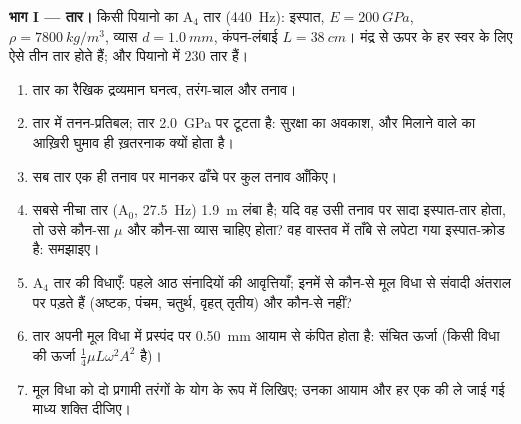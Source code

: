 \begin{problem}
\label{pb:b2:waves-on-strings:1}

\medskip
\noindent\textbf{भाग I --- तार।}
किसी पियानो का A$_4$ तार (\qty{440}{Hz}): इस्पात, $E = \qty{200}{GPa}$, $\rho =
\qty{7800}{kg/m^3}$, व्यास $d = \qty{1.0}{mm}$, कंपन-लंबाई $L =
\qty{38}{cm}$। मंद्र से ऊपर के हर स्वर के लिए ऐसे तीन तार होते हैं; और पियानो में
$230$ तार हैं।
\begin{enumerate}
  \item तार का रैखिक द्रव्यमान घनत्व, तरंग-चाल और तनाव।
  \item तार में तनन-प्रतिबल; तार \qty{2.0}{GPa} पर टूटता है: सुरक्षा
        का अवकाश, और मिलाने वाले का आख़िरी घुमाव ही ख़तरनाक क्यों होता
        है।
  \item सब तार एक ही तनाव पर मानकर ढाँचे पर कुल तनाव
        आँकिए।
  \item सबसे नीचा तार (A$_0$, \qty{27.5}{Hz}) \qty{1.9}{m} लंबा है; यदि वह
        उसी तनाव पर सादा इस्पात-तार होता, तो उसे कौन-सा $\mu$ और
        कौन-सा व्यास चाहिए होता? वह वास्तव में ताँबे से लपेटा गया इस्पात-क्रोड
        है: समझाइए।
  \item A$_4$ तार की विधाएँ: पहले आठ संनादियों की
        आवृत्तियाँ; इनमें से कौन-से मूल विधा से संवादी अंतराल पर पड़ते हैं
        (अष्टक, पंचम, चतुर्थ, वृहत् तृतीय) और कौन-से
        नहीं?
  \item तार अपनी मूल विधा में प्रस्पंद पर \qty{0.50}{mm} आयाम से
        कंपित होता है: संचित ऊर्जा (किसी विधा की ऊर्जा
        $\tfrac14\mu L\omega^2A^2$ है)।
  \item मूल विधा को दो प्रगामी तरंगों के योग के रूप में लिखिए; उनका
        आयाम और हर एक की ले जाई गई माध्य शक्ति दीजिए।
\end{enumerate}


\end{problem}
